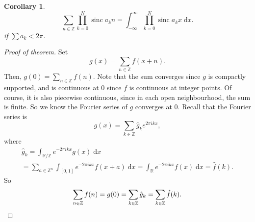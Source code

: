 \documentclass{shortart}
\newtheorem{cor}[thm]{Corollary}
\theoremstyle{definition}
\newcommand\Z{\mathbb{Z}}
\newcommand\R{\mathbb{R}}
\DeclareMathOperator\sinc{sinc}
\renewcommand\d{\mathrm{d}}
\begin{document}
\begin{cor}
  \[
    \sum_{n \in \Z} \prod_{k = 0}^N \sinc a_k n = \int_{-\infty}^\infty \prod_{k = 0}^N \sinc a_k x \;\d x.
  \]
  if $\sum a_k < 2\pi$.
\end{cor}

\begin{proof}[Proof of theorem]
  Set
  \[
    g(x) = \sum_{n \in \Z} f(x + n).
  \]
  Then, $g(0) = \sum_{n \in \Z} f(n)$. Note that the sum converges since $g$ is compactly supported, and is continuous at $0$ since $f$ is continuous at integer points. Of course, it is also piecewise continuous, since in each open neighbourhood, the sum is finite. So we know the Fourier series of $g$ converges at $0$. Recall that the Fourier series is
  \[
    g(x) = \sum_{k \in \Z} \hat{g}_k e^{2\pi i k x},
  \]
  where
  \begin{multline*}
    \hat{g}_k = \int_{\R/\Z} e^{-2\pi i k x} g(x) \;\d x \\
    = \sum_{a \in \Z^n} \int_{[0, 1]} e^{-2\pi i k x} f(x + a)\;\d x = \int_\R e^{-2\pi i k x} f(x) \;\d x = \hat{f}(k).
  \end{multline*}
  So
  \[
    \sum_{n \in \Z} f(n) = g(0) = \sum_{k \in \Z} \hat{g}_k = \sum_{k \in \Z} \hat{f}(k).\qedhere
  \]
\end{proof}
\end{document}
